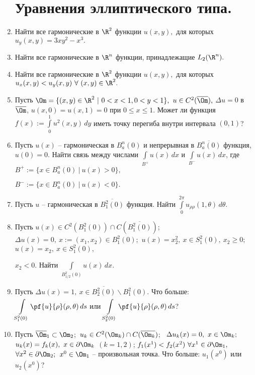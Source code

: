 \documentclass[a4paper]{article}
\def\D{\Delta}
\def\i#1#2{\int\limits_{#1}^{#2}}
\begin{document}
\begin{enumerate}
\section{Уравнения эллиптического типа.}


\item
Найти все гармонические в $\R^2$ функции $u(x,y),$ для которых
$u_y(x,y)=3xy^2-x^3.$

\item
Найти все гармонические в $\R^n$ функции, принадлежащие $L_2(
\R^n).$

\item
Найти все гармонические в $\R^2$ функции $u(x,y),$ для которых
$u_x(x,y)<u_y(x,y)\ \forall\ (x,y)\in \R^2.$

\item
Пусть $\Om =\{(x,y)\in \R^2\ |\ 0<x<1, 0<y<1\},$ $u\in
C^2(\overline \Om),$ $\D u=0$ в $\overline \Om$, $u(x, 0) = u(x, 1) = 0$ при
$0\le x \le 1$. Может ли функция $f(x):=\displaystyle{\i{0}{1} u^2(x, y)\,
dy}$ иметь
точку перегиба внутри интервала $(0,1)$?

\item
Пусть $u(x)$ -- гармоническая в $B_a^n(0)$ и непрерывная в
$\overline {B_a^n(0)}$ функция, $u(0)=0$. Найти связь между числами
$\displaystyle{\i{B^+}{} u(x)\, dx}$ и $\displaystyle{\i{B^-}{} u(x)\, dx}$,
где
$B^+ :=\{x\in B_a^n(0)\ |\ u(x)>0\},$

\noindent
$B^- :=\{x\in B_a^n(0)\ |\ u(x)<0\}.$

\item
Пусть $u$ -- гармоническая в $\overline{B_1^2(0)}$ функция.
Найти $\displaystyle{\i{0}{2\pi} u_{\rho\rho}(1, \theta)\, d\theta}$.

\item
Пусть $u(x)\in C^2(B_1^2(0))\cap C(\overline{B_1^2(0)})$; \
$\D u(x)=0,\ x:=(x_1,x_2)\in B_1^2(0);$ $u(x)=x_2^2,\ x\in S_1^2(0),\
x_2\ge0;$ $u(x)=x_2,\ x\in S_1^2(0),$

\noindent
$x_2<0.$ Найти $\displaystyle{\i{B_{1/2}^2(0)}{} u(x)\, dx}$.

\item
Пусть $\D u(x)=1,\ x\in \overline{B_2^2(0)}\backslash B_1^2(0).$
Что больше:
$\displaystyle{\i{S_1^2(0)}{} \pf{u}{\rho}(\rho,\theta)\, ds}$ или
$\displaystyle{\i{S_2^2(0)}{} \pf{u}{\rho}(\rho,\theta)\, ds}$?

\item
Пусть $\overline{\Om}_1\subset\Om_2$;\ $u_k\in C^2(\Om_k)\cap C(\overline
{\Om_k})$; \ $\D u_k(x)=0,\ x\in \Om_k;$ $u_k(x)=f_k(x),\ x\in \partial
\Om_k$ $(k=1,2)$; $f_1(x^1)<f_2(x^2)\ \forall x^1\in\partial\Om_1,$
$\forall x^2\in\partial\Om_2;$\ $x^0\in\Om_1$ -- произвольная точка.
Что больше: $u_1(x^0)$ или $u_2(x^0)$?


\end{enumerate}
\end{document}
